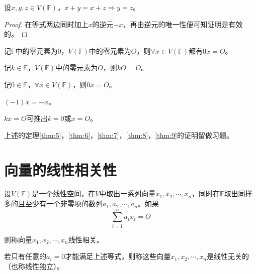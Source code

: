     \begin{theorem}[加法消去律]
        \label{thm:4}
        设$x,y,z\in V(\mathbb{F})$，$x+y=x+z \Rightarrow y=z$。
    \end{theorem}
    \begin{proof}
        在等式两边同时加上$x$的逆元$-x$，再由逆元的唯一性便可知证明是有效的。
    \end{proof}
    
    \begin{theorem}
        \label{thm:5}
        记$\mathbb{F}$中的零元素为$0$，$V(\mathbb{F})$中的零元素为$O$，则$\forall x\in V(\mathbb{F})$都有$0x=O$。
    \end{theorem}

    \begin{theorem}
        \label{thm:6}
        记$k\in\mathbb{F}$，$V(\mathbb{F})$中的零元素为$O$，则$kO=O$。
    \end{theorem}
    
    \begin{theorem}
        \label{thm:7}
        记$0\in\mathbb{F}$，$\forall x\in V(\mathbb{F})$，则$0x=O$。
    \end{theorem}
    
    \begin{theorem}
        \label{thm:8}
        $(-1)x=-x$。
    \end{theorem}

    \begin{theorem}
        \label{thm:9}
        $kx=O$可推出$k=0$或$x=O$。
    \end{theorem}

    上述的定理\ref{thm:5}，\ref{thm:6}，\ref{thm:7}，\ref{thm:8}，\ref{thm:9}的证明留做习题。

    \section{向量的线性相关性}
    \begin{definition}[线性相关]
        设$V(\mathbb{F})$是一个线性空间，在$V$中取出一系列向量$x_1,x_2,\cdots,x_n$，同时在$\mathbb{F}$取出同样多的且至少有一个非零项的数列$a_1,a_2,\cdots,a_n$。如果
        \begin{equation}
            \label{eq:17}
            \sum_{i=1}^{n}a_ix_i=O
        \end{equation}
        
        则称向量$x_1,x_2,\cdots,x_n$线性相关。
    \end{definition}
    
    若只有任意的$a_i=0$才能满足上述等式，则称这些向量$x_1,x_2,\cdots,x_n$是线性无关的（也称线性独立）。